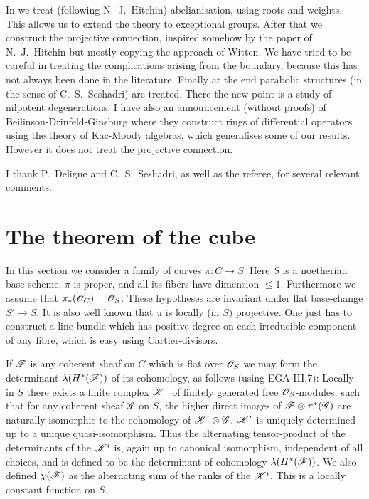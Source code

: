 \documentclass[12pt,english]{smfart}
\theoremstyle{plain} \newtheorem{innerthm}{Theorem} \newtheorem{innerlem}{Lemma} \newtheorem{innerprop}{Proposition} \newtheorem{innercor}{Corollary} \theoremstyle{definition} \newtheorem{innerdefn}{Definition} \newtheorem{innerconstr}{Construction} \theoremstyle{remark} \newtheorem*{remark}{Remark} \newtheorem*{remarks}{Remarks} \newtheorem*{applications}{Applications}
\begin{document}
In  we treat (following N.~J.~Hitchin) abelianisation, using roots and weights. This allows us to extend the theory to exceptional groups. After that we construct the projective connection, inspired somehow by
the paper of N.~J.~Hitchin but mostly copying the approach of Witten. We have tried to be careful in treating the complications arising from the boundary, because this has not always been done in the literature. Finally at the end parabolic structures (in the sense of C.~S.~Seshadri) are treated. There the new point is a study of nilpotent degenerations. I have also an announcement (without proofs) of Beilinson-Drinfeld-Ginsburg where they construct rings of differential operators using the theory of Kac-Moody algebras, which generalises some of our results. However it does not treat the projective connection.

I thank P.~Deligne and C.~S.~Seshadri, as well as the referee, for several relevant comments.

\section{The theorem of the cube}\label{sec:I}

In this section we consider a family of curves $\pi\colon C\to S$. Here $S$ is a noetherian base-scheme, $\pi$ is proper, and all its fibers have dimension $\le 1$. Furthermore we assume that $\pi_*(\mathscr{O}_C)=\mathscr{O}_S$. These hypotheses are invariant under flat base-change $S'\to S$. It is also well known that $\pi$ is locally (in $S$) projective. One just has to construct a line-bundle which has positive degree on each irreducible component of any fibre, which is easy using Cartier-divisors.

If $\mathscr{F}$ is any coherent sheaf on $C$ which is flat over $\mathscr{O}_S$ we may form the determinant $\lambda(H^*(\mathscr{F}))$ of its cohomology, as follows (using EGA III,7): Locally in $S$ there exists a finite complex $\mathscr{K}^{\textstyle\cdot}$ of finitely generated free $\mathscr{O}_S$-modules, such that for any coherent sheaf $\mathscr{G}$ on $S$, the higher direct images of $\mathscr{F}\otimes\pi^*(\mathscr{G})$ are naturally isomorphic to the cohomology of $\mathscr{K}^{\textstyle\cdot}\otimes\mathscr{G}$. $\mathscr{K}^{\textstyle\cdot}$ is uniquely determined up to a unique quasi-isomorphism. Thus the alternating tensor-product of the determinants of the $\mathscr{K}^i$ is, again up to canonical isomorphism, independent of all choices, and is defined to be the determinant of cohomology $\lambda(H^*(\mathscr{F}))$. We also defined $\chi(\mathscr{F})$ as the alternating sum of the ranks of the $\mathscr{K}^i$. This is a locally constant function on $S$.
\end{document}
